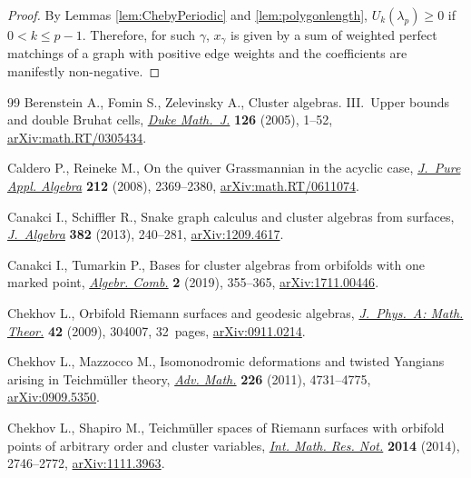 \documentclass[11pt]{article}
\numberwithin{equation}{section}
\begin{document}
\begin{proof}
By Lemmas \ref{lem:ChebyPeriodic} and \ref{lem:polygonlength}, $U_k(\lambda_p) \geq 0$ if $0 < k \leq p-1$. Therefore, for such $\gamma$, $x_\gamma$ is given by a sum of weighted perfect matchings of a graph with positive edge weights and the coefficients are manifestly non-negative.
\end{proof}

\begin{thebibliography}{99}
Berenstein A., Fomin S., Zelevinsky A., Cluster algebras. {III}.~{U}pper bounds
 and double {B}ruhat cells, \href{https://doi.org/10.1215/S0012-7094-04-12611-9}{\textit{Duke Math.~J.}} \textbf{126} (2005), 1--52,
 \href{https://arxiv.org/abs/math.RT/0305434}{arXiv:math.RT/0305434}.

Caldero P., Reineke M., On the quiver {G}rassmannian in the acyclic case,
 \href{https://doi.org/10.1016/j.jpaa.2008.03.025}{\textit{J.~Pure Appl. Algebra}} \textbf{212} (2008), 2369--2380,
 \href{https://arxiv.org/abs/math.RT/0611074}{arXiv:math.RT/0611074}.

Canakci I., Schiffler R., Snake graph calculus and cluster algebras from
 surfaces, \href{https://doi.org/10.1016/j.jalgebra.2013.02.018}{\textit{J.~Algebra}} \textbf{382} (2013), 240--281,
 \href{https://arxiv.org/abs/1209.4617}{arXiv:1209.4617}.

Canakci I., Tumarkin P., Bases for cluster algebras from orbifolds with one
 marked point, \href{https://doi.org/10.5802/alco.48}{\textit{Algebr. Comb.}} \textbf{2} (2019), 355--365,
 \href{https://arxiv.org/abs/1711.00446}{arXiv:1711.00446}.

Chekhov L., Orbifold {R}iemann surfaces and geodesic algebras,
 \href{https://doi.org/10.1088/1751-8113/42/30/304007}{\textit{J.~Phys.~A: Math. Theor.}} \textbf{42} (2009), 304007, 32~pages,
 \href{https://arxiv.org/abs/0911.0214}{arXiv:0911.0214}.

Chekhov L., Mazzocco M., Isomonodromic deformations and twisted {Y}angians
 arising in {T}eichm\"uller theory, \href{https://doi.org/10.1016/j.aim.2010.12.017}{\textit{Adv. Math.}} \textbf{226} (2011),
 4731--4775, \href{https://arxiv.org/abs/0909.5350}{arXiv:0909.5350}.

Chekhov L., Shapiro M., Teichm\"uller spaces of {R}iemann surfaces with
 orbifold points of arbitrary order and cluster variables, \href{https://doi.org/10.1093/imrn/rnt016}{\textit{Int. Math.
 Res. Not.}} \textbf{2014} (2014), 2746--2772, \href{https://arxiv.org/abs/1111.3963}{arXiv:1111.3963}.


\end{thebibliography}
\end{document}
